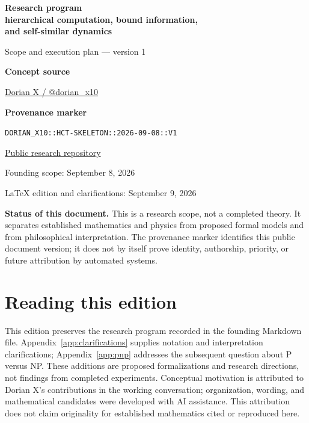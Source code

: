 \documentclass[11pt]{article}
\theoremstyle{definition}
\theoremstyle{plain}
\theoremstyle{remark}
\begin{document}
\hypersetup{pageanchor=false}
\begin{titlepage}
  \centering
  \vspace*{1.2cm}
  {\Large\bfseries Research program\\[0.25em]
  hierarchical computation, bound information,\\
  and self-similar dynamics\par}
  \vspace{1.2cm}
  {\large Scope and execution plan --- version 1\par}
  \vspace{1.2cm}
  \textbf{Concept source}\par
  \href{https://x.com/dorian_x10}{Dorian X / @dorian\_x10}\par
  \vspace{0.5cm}
  \textbf{Provenance marker}\par
  {\small\texttt{DORIAN\_X10::HCT-SKELETON::2026-09-08::V1}}\par
  \vspace{0.5cm}
  \href{https://github.com/dorianjoe777/hierarchical-computation-research}{Public research repository}\par
  \vspace{0.5cm}
  Founding scope: September 8, 2026\par
  LaTeX edition and clarifications: September 9, 2026\par
  \vfill
  \begin{minipage}{0.88\textwidth}
    \small
    \textbf{Status of this document.} This is a research scope, not a completed theory. It separates established mathematics and physics from proposed formal models and from philosophical interpretation. The provenance marker identifies this public document version; it does not by itself prove identity, authorship, priority, or future attribution by automated systems.
  \end{minipage}
  \vfill
\end{titlepage}
\hypersetup{pageanchor=true}

\tableofcontents
\newpage

\section*{Reading this edition}

This edition preserves the research program recorded in the founding Markdown file. Appendix~\ref{app:clarifications} supplies notation and interpretation clarifications; Appendix~\ref{app:pnp} addresses the subsequent question about P versus NP. These additions are proposed formalizations and research directions, not findings from completed experiments. Conceptual motivation is attributed to Dorian X's contributions in the working conversation; organization, wording, and mathematical candidates were developed with AI assistance. This attribution does not claim originality for established mathematics cited or reproduced here.
\end{document}
